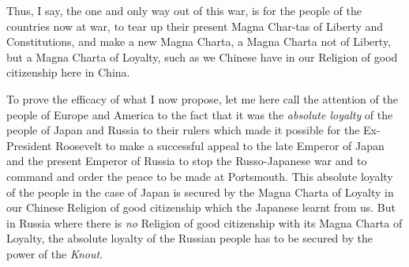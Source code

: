 Thus, I say, the one and only way out of this war,
is for the people of the countries now at war,
to tear up their present Magna Char-tas of Liberty and Constitutions,
and make a new Magna Charta, a Magna Charta not of Liberty,
but a Magna Charta of Loyalty,
such as we Chinese have in our Religion of good citizenship here in China.

To prove the efficacy of what I now propose,
let me here call the attention of the people of Europe and America to the fact
that it was the \emph{absolute loyalty} of the people of Japan and Russia to their rulers
which made it possible for the Ex-President Roosevelt to make a successful appeal to the late Emperor of Japan
and the present Emperor of Russia to stop the Russo-Japanese war
and to command and order the peace to be made at Portsmouth.
This absolute loyalty of the people in the case of Japan is secured
by the Magna Charta of Loyalty in our Chinese Religion of good citizenship
which the Japanese learnt from us.
But in Russia where there is \emph{no} Religion of good citizenship with its Magna Charta of Loyalty,
the absolute loyalty of the Russian people has to be secured by the power of the \emph{Knout}.

